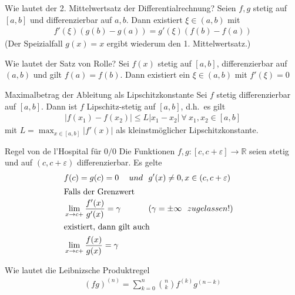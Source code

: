 \begin{karte}{Wie lautet der 2. Mittelwertsatz der Differentialrechnung?}
	Seien \(f, g\) stetig auf \([a,b]\) und differenzierbar auf \(a,b\). Dann existiert \(\xi\in(a,b)\) mit
	\begin{align}
		f'(\xi)(g(b)-g(a))=g'(\xi)(f(b)-f(a))
	\end{align}
	(Der Speizialfall \(g(x)=x\) ergibt wiederum den 1. Mittelwertsatz.)
\end{karte}



\begin{karte}{Wie lautet der Satz von Rolle?}
	Sei \(f(x)\) stetig auf \([a,b]\), differenzierbar auf \((a,b)\) und gilt \(f(a)=f(b)\). Dann existiert ein \(\xi \in (a,b) \) mit \(f'(\xi)=0\)
\end{karte}

\begin{karte}{Maximalbetrag der Ableitung als Lipschitzkonstante}
	Sei \(f\) stetig differenzierbar auf \([a,b]\). Dann ist \(f\) Lipschitz-stetig auf \([a,b]\), d.h.\ es gilt
	\begin{align}
		\lvert f(x_1)-f(x_2)\rvert \leq L\lvert x_1 - x_2\rvert \  \forall\  x_1,x_2 \in [a,b]
	\end{align}
	mit \(L=\displaystyle\max_{x\in[a,b]}\lvert f'(x)\rvert \) als kleinstmöglicher Lipschitzkonstante.

\end{karte}

\begin{karte}{Regel von de l'Hospital für \(0/0\)}
	Die Funktionen \(f,g:[c,c+\varepsilon]\to\mathbb{R}\) seien stetig und auf \((c,c+\varepsilon)\) differenzierbar. Es gelte
	\begin{align}
		  & f(c)=g(c)=0                              & und\ \ &g'(x)\neq 0, x\in(c,c+\varepsilon) &                                    \\
		\intertext{%
		Falls der Grenzwert}
		  & \lim_{x\to c+}\frac{f'(x)}{g'(x)}=\gamma &        &(\gamma=\pm\infty\ \ zugelassen!)  \\
		\intertext{%
		existiert, dann gilt auch}
		  & \lim_{x\to c+}\frac{f(x)}{g(x)}=\gamma   &        &
	\end{align}

\end{karte}

\begin{karte}{Wie lautet die Leibnizsche Produktregel}
	\begin{align}
		{(fg)}^{(n)}=\sum_{k=0}^{n} \binom{n}{k}f^{(k)}g^{(n-k)}
	\end{align}
\end{karte}
